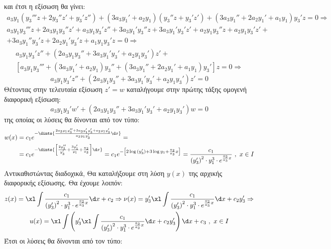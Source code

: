 \documentclass[a4paper,twoside,11pt]{book}
\DeclareRobustCommand{\frac}[3][0pt]{%
{\begingroup\hspace{#1}#2\hspace{#1}\endgroup\over\hspace{#1}#3\hspace{#1}}}
\begin{document}
και έτσι η εξίσωση θα γίνει:
\begin{gather}
a_3y_1\left( y_3'''z+2y_3''z'+y_3'z''\right)+\left( 3a_3y_1'+a_2y_1\right)\left( y_3''z+y_3'z'\right)+\left( 3a_3y_1''+2a_2y_1'+a_1y_1\right)y_3'z=0\Rightarrow\nonumber
\end{gather}
\vspace{-8mm}
\begin{multline*}
a_3y_1y_3'''z+2a_3y_1y_3''z'+a_3y_1y_3'z''+3a_3y_1'y_3''z+3a_3y_1'y_3'z'+a_2y_1y_3''z+a_2y_1y_3'z'+\\+ 3a_3y_1''y_3'z+2a_2y_1'y_3'z+a_1y_1y_3'z=0\Rightarrow
\end{multline*}
\vspace{-11mm}
\begin{multline*}
a_3y_1y_3'z''+\left( 2a_3y_1y_3''+3a_3y_1'y_3'+a_2y_1y_3'\right)z'+\\\left[ a_3y_1y_3'''+\left( 3a_3y_1'+a_2y_1\right)y_3''+\left( 3a_3y_1''+2a_2y_1'+a_1y_1\right)y_3'\right]z=0\Rightarrow
\end{multline*}
\begin{equation*}
a_3y_1y_3'z''+\left( 2a_3y_1y_3''+3a_3y_1'y_3'+a_2y_1y_3'\right)z'=0
\end{equation*}
Θέτοντας στην τελευταία εξίσωση $ z'=w $ καταλήγουμε στην πρώτης τάξης ομογενή διαφορική εξίσωση:
\[ a_3y_1y_3'w'+\left( 2a_3y_1y_3''+3a_3y_1'y_3'+a_2y_1y_3'\right)w=0 \]
της οποίας οι λύσεις θα δίνονται από τον τύπο:
\begin{align*}
w(x)&=c_1e^{-\dints{\frac{2a_3y_1y_3''+3a_3y_1'y_3'+a_2y_1y_3'}{a_3y_1y_3'}\d x}}=\\&=c_1e^{-\dints{\left[ \frac{2y_3''}{y_3'}+\frac{3y_1'}{y_1}+\frac{a_2}{a_3}\right] \d x}}=c_1e^{-\left[2\log{(y_3')}+3\log{y_1}+\frac{a_2}{a_3}x \right] }=\frac{c_1}{\left(y_3'\right)^2\cdot y_1^3\cdot e^{\frac{a_2}{a_3}x} }\ ,\ x\in I
\end{align*}
Αντικαθιστώντας διαδοχικά, Θα καταλήξουμε στη λύση $ y(x) $ της αρχικής διαφορικής εξίσωσης. Θα έχουμε λοιπόν:
\begin{gather*}
z(x)=\xl\int{\frac{c_1}{\left(y_3'\right)^2\cdot y_1^3\cdot e^{\frac{a_2}{a_3}x} }\d x}+c_2\Rightarrow \nu(x)=y_3'\xl\int{\frac{c_1}{\left(y_3'\right)^2\cdot y_1^3\cdot e^{\frac{a_2}{a_3}x} }\d x}+c_2y_3'\Rightarrow\\
u(x)=\xl\int{\left( y_3'\xl\int{\frac{c_1}{\left(y_3'\right)^2\cdot y_1^3\cdot e^{\frac{a_2}{a_3}x} }\d x}+c_2y_3'\right) \d x}+c_3\ ,\ x\in I
\end{gather*}
Έτσι οι λύσεις θα δίνονται από τον τύπο:
\end{document}
